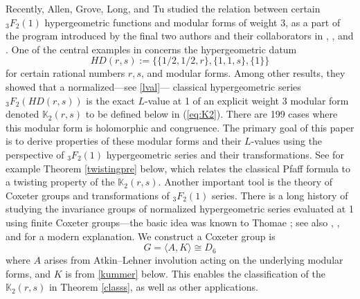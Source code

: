 \documentclass[12pt]{amsart}
\theoremstyle{definition}
\theoremstyle{remark}
\begin{document}
Recently, Allen, Grove, Long, and Tu \cite{aglt} studied the relation between certain ${}_3F_2(1)$ hypergeometric functions and modular forms of weight 3, as a part of the program introduced by the final two authors and their collaborators in \cite{flrst}, \cite{lilongtu}, and \cite{whipple}. One of the central examples in \cite{aglt} concerns the hypergeometric datum $$HD(r,s):=\{\{1/2,1/2,r\},\{1,1,s\},\{1\}\}$$ for certain rational numbers $r,s$, and modular forms. Among other results, they showed that a normalized---see \eqref{lval}--- classical hypergeometric series ${}_3F_2(HD(r,s))$ is the exact $L$-value at 1 of an explicit weight 3 modular form denoted $\mathbb{K}_2(r,s)$ to be defined below in (\ref{eq:K2}). There are 199 cases where this modular form is holomorphic and congruence. The primary goal of this paper is to derive properties of these modular forms and their $L$-values using the perspective of ${}_3F_2(1)$ hypergeometric series and their transformations. See for example Theorem \ref{twistingpre} below, which relates the classical Pfaff formula to a twisting property of the $\mathbb{K}_2(r,s)$. Another important tool is the theory of Coxeter groups and transformations of ${}_3F_2(1)$ series. There is a long history of studying the invariance groups of normalized hypergeometric series evaluated at 1 using finite Coxeter groups---the basic idea was known to Thomae \cite{thomae}; see also \cite{coxeter}, \cite{formichella}, and \cite{green} for a modern explanation.  
We construct a Coxeter group is $$G=\langle A, K\rangle\cong D_6$$ where $A$ arises from Atkin--Lehner involution acting on the underlying modular forms, and $K$ is from \eqref{kummer} below. This enables the classification of the $\mathbb{K}_2(r,s)$ in Theorem \ref{classs}, as well as other applications.
\end{document}
